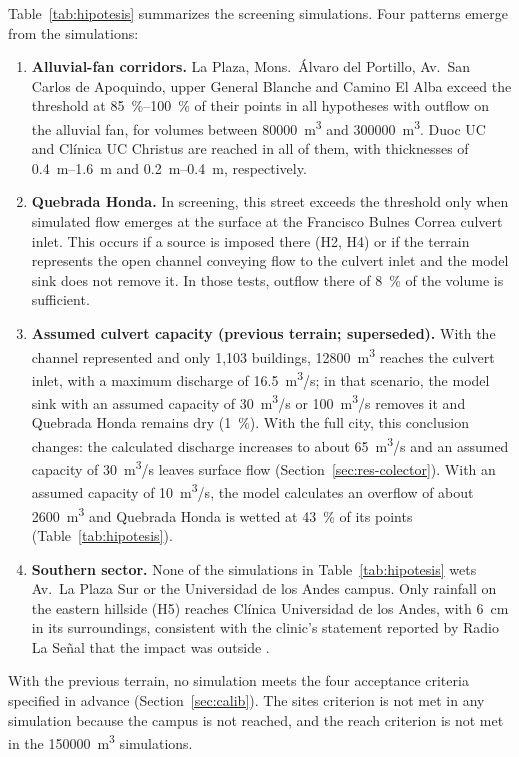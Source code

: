 Table~\ref{tab:hipotesis} summarizes the screening simulations. Four patterns emerge from the simulations:
\begin{enumerate}
\item \textbf{Alluvial-fan corridors.} La Plaza, Mons.\ Álvaro del Portillo, Av.\ San Carlos de Apoquindo, upper General Blanche and Camino El Alba exceed the threshold at \SIrange{85}{100}{\percent} of their points in all hypotheses with outflow on the alluvial fan, for volumes between \SI{80000}{m^3} and \SI{300000}{m^3}. Duoc UC and Clínica UC Christus are reached in all of them, with thicknesses of \SIrange{0.4}{1.6}{m} and \SIrange{0.2}{0.4}{m}, respectively.
\item \textbf{Quebrada Honda.} In screening, this street exceeds the threshold only when simulated flow emerges at the surface at the Francisco Bulnes Correa culvert inlet. This occurs if a source is imposed there (H2, H4) or if the terrain represents the open channel conveying flow to the culvert inlet and the model sink does not remove it. In those tests, outflow there of \SI{8}{\percent} of the volume is sufficient.
\item \textbf{Assumed culvert capacity (previous terrain; superseded).} With the channel represented and only 1,103 buildings, \SI{12800}{m^3} reaches the culvert inlet, with a maximum discharge of \SI{16.5}{m^3/s}; in that scenario, the model sink with an assumed capacity of \SI{30}{m^3/s} or \SI{100}{m^3/s} removes it and Quebrada Honda remains dry (\SI{1}{\percent}). With the full city, this conclusion changes: the calculated discharge increases to about \SI{65}{m^3/s} and an assumed capacity of \SI{30}{m^3/s} leaves surface flow (Section~\ref{sec:res-colector}). With an assumed capacity of \SI{10}{m^3/s}, the model calculates an overflow of about \SI{2600}{m^3} and Quebrada Honda is wetted at \SI{43}{\percent} of its points (Table~\ref{tab:hipotesis}).
\item \textbf{Southern sector.} None of the simulations in Table~\ref{tab:hipotesis} wets Av.\ La Plaza Sur or the Universidad de los Andes campus. Only rainfall on the eastern hillside (H5) reaches Clínica Universidad de los Andes, with \SI{6}{cm} in its surroundings, consistent with the clinic's statement reported by Radio La Señal that the impact was outside \citep{radiolasenal2026}.
\end{enumerate}
With the previous terrain, no simulation meets the four acceptance criteria specified in advance (Section~\ref{sec:calib}). The sites criterion is not met in any simulation because the campus is not reached, and the reach criterion is not met in the \SI{150000}{m^3} simulations.

